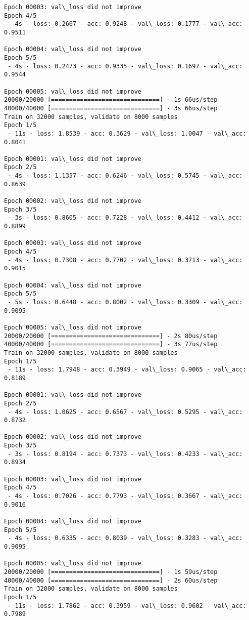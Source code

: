 \documentclass[11pt]{article}
\begin{document}
\begin{Verbatim}[commandchars=\\\{\}]
Epoch 00003: val\_loss did not improve
Epoch 4/5
 - 4s - loss: 0.2667 - acc: 0.9248 - val\_loss: 0.1777 - val\_acc: 0.9511

Epoch 00004: val\_loss did not improve
Epoch 5/5
 - 4s - loss: 0.2473 - acc: 0.9335 - val\_loss: 0.1697 - val\_acc: 0.9544

Epoch 00005: val\_loss did not improve
20000/20000 [==============================] - 1s 66us/step
40000/40000 [==============================] - 3s 66us/step
Train on 32000 samples, validate on 8000 samples
Epoch 1/5
 - 11s - loss: 1.8539 - acc: 0.3629 - val\_loss: 1.0047 - val\_acc: 0.8041

Epoch 00001: val\_loss did not improve
Epoch 2/5
 - 4s - loss: 1.1357 - acc: 0.6246 - val\_loss: 0.5745 - val\_acc: 0.8639

Epoch 00002: val\_loss did not improve
Epoch 3/5
 - 3s - loss: 0.8605 - acc: 0.7228 - val\_loss: 0.4412 - val\_acc: 0.8899

Epoch 00003: val\_loss did not improve
Epoch 4/5
 - 4s - loss: 0.7308 - acc: 0.7702 - val\_loss: 0.3713 - val\_acc: 0.9015

Epoch 00004: val\_loss did not improve
Epoch 5/5
 - 5s - loss: 0.6448 - acc: 0.8002 - val\_loss: 0.3309 - val\_acc: 0.9095

Epoch 00005: val\_loss did not improve
20000/20000 [==============================] - 2s 80us/step
40000/40000 [==============================] - 3s 77us/step
Train on 32000 samples, validate on 8000 samples
Epoch 1/5
 - 11s - loss: 1.7948 - acc: 0.3949 - val\_loss: 0.9065 - val\_acc: 0.8189

Epoch 00001: val\_loss did not improve
Epoch 2/5
 - 4s - loss: 1.0625 - acc: 0.6567 - val\_loss: 0.5295 - val\_acc: 0.8732

Epoch 00002: val\_loss did not improve
Epoch 3/5
 - 3s - loss: 0.8194 - acc: 0.7373 - val\_loss: 0.4233 - val\_acc: 0.8934

Epoch 00003: val\_loss did not improve
Epoch 4/5
 - 4s - loss: 0.7026 - acc: 0.7793 - val\_loss: 0.3667 - val\_acc: 0.9016

Epoch 00004: val\_loss did not improve
Epoch 5/5
 - 4s - loss: 0.6335 - acc: 0.8039 - val\_loss: 0.3283 - val\_acc: 0.9095

Epoch 00005: val\_loss did not improve
20000/20000 [==============================] - 1s 59us/step
40000/40000 [==============================] - 2s 60us/step
Train on 32000 samples, validate on 8000 samples
Epoch 1/5
 - 11s - loss: 1.7862 - acc: 0.3959 - val\_loss: 0.9602 - val\_acc: 0.7989


\end{Verbatim}
\end{document}
